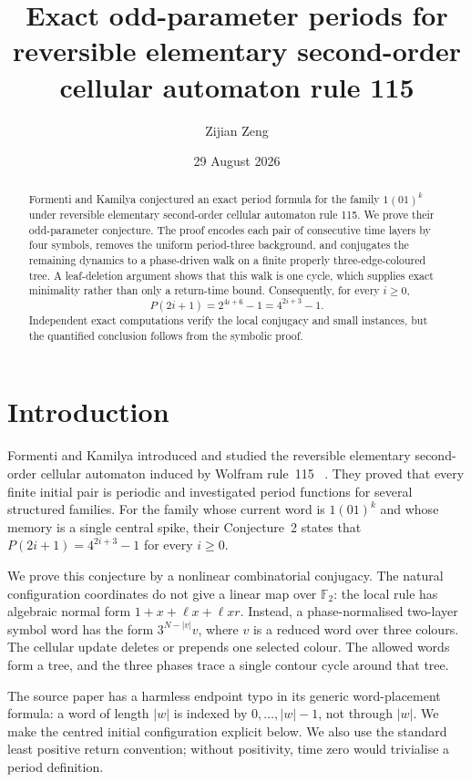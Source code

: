 \documentclass[11pt]{amsart}
\title[Odd-parameter periods for RESOCA 115]{Exact odd-parameter periods for reversible elementary second-order cellular automaton rule 115}
\author{Zijian Zeng}
\date{29 August 2026}
\theoremstyle{definition}
\begin{document}
\begin{abstract}
Formenti and Kamilya conjectured an exact period formula for the family
\(1{(01)}^k\) under reversible elementary second-order cellular automaton rule
115.  We prove their odd-parameter conjecture.  The proof encodes each pair of
consecutive time layers by four symbols, removes the uniform period-three
background, and conjugates the remaining dynamics to a phase-driven walk on
a finite properly three-edge-coloured tree.  A leaf-deletion argument shows
that this walk is one cycle, which supplies exact minimality rather than only
a return-time bound.  Consequently, for every \(i\geq0\),
\[
P(2i+1)=2^{4i+6}-1=4^{2i+3}-1.
\]
Independent exact computations verify the local conjugacy and small instances,
but the quantified conclusion follows from the symbolic proof.
\end{abstract}

\maketitle

\section{Introduction}

Formenti and Kamilya introduced and studied the reversible elementary
second-order cellular automaton induced by Wolfram rule~115
~\cite{FormentiKamilya2026}.  They proved that every finite initial pair is
periodic and investigated period functions for several structured families.
For the family whose current word is \(1{(01)}^k\) and whose memory is a single
central spike, their Conjecture~2 states that
\(P(2i+1)=4^{2i+3}-1\) for every \(i\geq0\).

We prove this conjecture by a nonlinear combinatorial conjugacy.  The natural
configuration coordinates do not give a linear map over \(\mathbb F_2\): the
local rule has algebraic normal form
\(1+x+\ell x+\ell xr\).  Instead, a phase-normalised two-layer symbol word
has the form \(3^{N-|v|}v\), where \(v\) is a reduced word over three colours.
The cellular update deletes or prepends one selected colour.  The allowed
words form a tree, and the three phases trace a single contour cycle around
that tree.

The source paper has a harmless endpoint typo in its generic word-placement
formula: a word of length \(|w|\) is indexed by
\(0,\ldots,|w|-1\), not through \(|w|\).  We make the centred initial
configuration explicit below.  We also use the standard least positive
return convention; without positivity, time zero would trivialise a period
definition.
\end{document}
